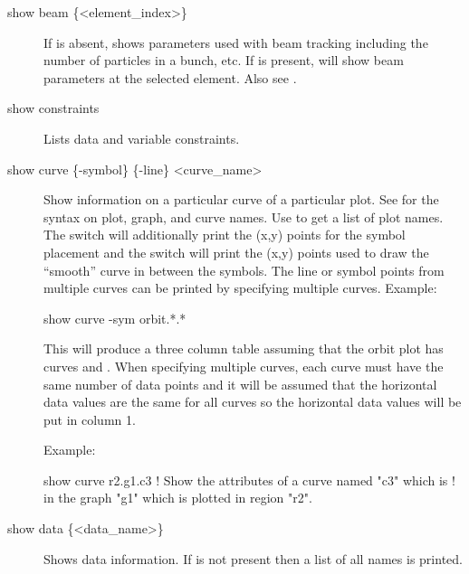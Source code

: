 {{{\begin{description}

\item[show beam \{<element\_index>\}] \Newline
If  is absent,  shows parameters 
used with beam tracking including the number of particles in a bunch, etc.
If  is present,  will show 
beam parameters at the selected element. Also see .


\item[show constraints] \Newline
Lists data and variable constraints.


\item[show curve \{-symbol\} \{-line\} <curve\_name>] \Newline
Show information on a particular curve of a particular plot. See
 for the syntax on plot, graph, and curve names.  Use
 to get a list of plot names. The  switch
will additionally print the (x,y) points for the symbol placement and
the  switch will print the (x,y) points used to draw the
``smooth'' curve in between the symbols. The line or symbol points
from multiple curves can be printed by specifying multiple curves. Example:
\begin{example}
  show curve -sym orbit.*.*
\end{example}
This will produce a three column table assuming that the orbit plot
has curves  and . When specifying
multiple curves, each curve must have the same number of data points
and it will be assumed that the horizontal data values are the same
for all curves so the horizontal data values will be put in column 1.

Example:
\begin{example}
  show curve r2.g1.c3         ! Show the attributes of a curve named "c3" which is 
                              !   in the graph "g1" which is plotted in region "r2".
\end{example}


\item[show data \{<data\_name>\}] \Newline
Shows data information. If  is not
present then a list of all  names is printed.


\end{description}}}}
